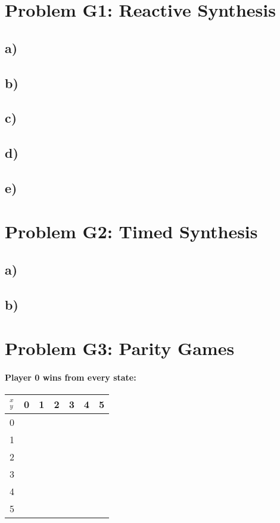 \documentclass[12pt]{article}
\begin{document}
\lstset{language=C++}


\section*{Problem G1: Reactive Synthesis}
\subsection*{a)}

\subsection*{b)}

\subsection*{c)}

\subsection*{d)}

\subsection*{e)}

\section*{Problem G2: Timed Synthesis}
\subsection*{a)}

\subsection*{b)}

\section*{Problem G3: Parity Games}

\paragraph*{Player 0 wins from every state:}


\begin{tabular}{c | c | c | c | c | c | c}
$_y ^x$ & 0 & 1 & 2 & 3 & 4 & 5 \\ \hline
0 & & & & & & \\ \hline
1 & & & & & & \\ \hline
2 & & & & & & \\ \hline
3 & & & & & & \\ \hline
4 & & & & & & \\ \hline
5 & & & & & & \\ 

\end{tabular}
\end{document}
